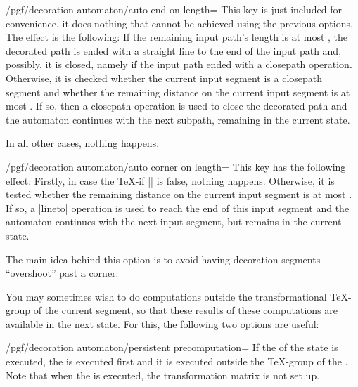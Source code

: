 \begin{command}{\pgfdeclaredecoration{}}
\begin{command}{\state{}}
    \begin{key}{/pgf/decoration automaton/auto end on length=}
      This key is just included for convenience, it does nothing that
      cannot be achieved using the previous options. The effect is the
      following: If the remaining input path's length is at most
      , the decorated path is ended with a straight
      line to the end of the input path and, possibly, it is closed,
      namely if the input path ended with a closepath
      operation. Otherwise, it is checked whether the current input
      segment is a closepath segment and whether the remaining
      distance on the current input segment is at most
      . If so, then a closepath operation is used to
      close the decorated path and the automaton continues with the
      next subpath, remaining in the current state.

      In all other cases, nothing happens.
    \end{key}

    \begin{key}{/pgf/decoration automaton/auto corner on length=}
      This key has the following effect: Firstly, in case the \TeX-if
      |\ifpgfdecoratepathhascorners| is false, nothing
      happens. Otherwise, it is tested whether the remaining distance
      on the current input segment is at most . If so,
      a |lineto| operation is used to reach the end of this input
      segment and the automaton continues with the next input segment,
      but remains in the current state.

      The main idea behind this option is to avoid having decoration
      segments ``overshoot'' past a corner.
    \end{key}

    You may sometimes wish to do computations outside the
    transformational \TeX-group of the current segment,
    so that these results of these computations are available in the
    next state. For this, the following two options are useful:

    \begin{key}{/pgf/decoration automaton/persistent precomputation=}
      If the  of the state is executed, the  is
      executed first and it is executed outside the \TeX-group of the
      . Note that when the  is executed, the
      transformation matrix is not set up.
    \end{key}


\end{command}
\end{command}
